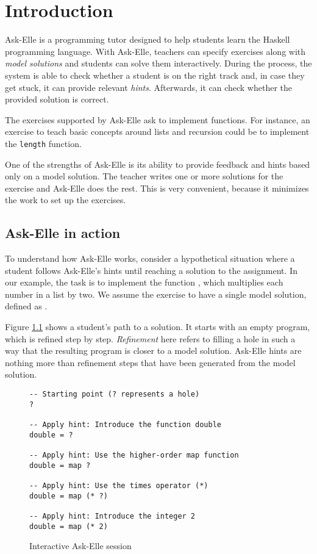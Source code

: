 \chapter{Introduction}
\label{sec:intro}

Ask-Elle \cite{2017askelle} is a programming tutor designed to help students learn the Haskell programming language. With Ask-Elle, teachers can specify exercises along with \emph{model solutions} and students can solve them interactively. During the process, the system is able to check whether a student is on the right track and, in case they get stuck, it can provide relevant \emph{hints}. Afterwards, it can check whether the provided solution is correct.

The exercises supported by Ask-Elle ask to implement functions. For instance, an exercise to teach basic concepts around lists and recursion could be to implement the \texttt{length} function.

One of the strengths of Ask-Elle is its ability to provide feedback and hints based only on a model solution. The teacher writes one or more solutions for the exercise and Ask-Elle does the rest. This is very convenient, because it minimizes the work to set up the exercises.

\section{Ask-Elle in action}
\label{sec:intro-askelle-example-session}

To understand how Ask-Elle works, consider a hypothetical situation where a student follows Ask-Elle's hints until reaching a solution to the assignment. In our example, the task is to implement the function , which multiplies each number in a list by two. We assume the exercise to have a single model solution, defined as .

Figure \ref{fig:interactive-session-double} shows a student's path to a solution. It starts with an empty program, which is refined step by step. \emph{Refinement} here refers to filling a hole in such a way that the resulting program is closer to a model solution. Ask-Elle hints are nothing more than refinement steps that have been generated from the model solution.

\begin{figure}
\begin{verbatim}
-- Starting point (? represents a hole)
?

-- Apply hint: Introduce the function double
double = ?

-- Apply hint: Use the higher-order map function
double = map ?

-- Apply hint: Use the times operator (*)
double = map (* ?)

-- Apply hint: Introduce the integer 2
double = map (* 2)
\end{verbatim}
\caption{Interactive Ask-Elle session}
\label{fig:interactive-session-double}
\end{figure}

